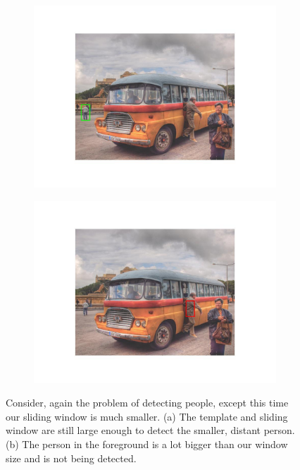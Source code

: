 \documentclass{article}
\begin{document}
\begin{figure}[h]
  \begin{subfigure}{0.48\textwidth}
    \includegraphics[width=\linewidth]{small_sliding_window_a.jpg}
    \caption{}
  \end{subfigure}
  \hspace*{\fill} %
  \begin{subfigure}{0.48\textwidth}
    \includegraphics[width=\linewidth]{small_sliding_window_b.jpg}
    \caption{}
  \end{subfigure}
  \caption{Consider, again the problem of detecting people, except this time our sliding window is much smaller. (a) The template and sliding window are still large enough to detect the smaller, distant person. (b) The person in the foreground is a lot bigger than our window size and is not being detected.}
\end{figure}
\end{document}
